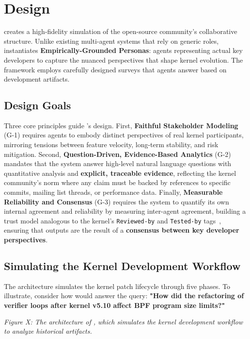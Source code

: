 
\section{Design}
\label{sec:design}

\sys creates a high-fidelity simulation of the open-source community's collaborative structure. Unlike existing multi-agent systems that rely on generic roles, \sys instantiates \textbf{Empirically-Grounded Personas}: agents representing actual key developers to capture the nuanced perspectives that shape kernel evolution. The framework employs carefully designed surveys that agents answer based on development artifacts.

\subsection{Design Goals}

Three core principles guide \sys's design. First, \textbf{Faithful Stakeholder Modeling} (G-1) requires agents to embody distinct perspectives of real kernel participants, mirroring tensions between feature velocity, long-term stability, and risk mitigation. Second, \textbf{Question-Driven, Evidence-Based Analytics} (G-2) mandates that the system answer high-level natural language questions with quantitative analysis and \textbf{explicit, traceable evidence}, reflecting the kernel community's norm where any claim must be backed by references to specific commits, mailing list threads, or performance data. Finally, \textbf{Measurable Reliability and Consensus} (G-3) requires the system to quantify its own internal agreement and reliability by measuring inter-agent agreement, building a trust model analogous to the kernel's \texttt{Reviewed-by} and \texttt{Tested-by} tags~\cite{kerneldocs-submitting}, ensuring that outputs are the result of a \textbf{consensus between key developer perspectives}.


\subsection{Simulating the Kernel Development Workflow}

The \sys architecture simulates the kernel patch lifecycle through five phases. To illustrate, consider how \sys would answer the query: \textbf{"How did the refactoring of verifier loops after kernel v5.10 affect BPF program size limits?"}

\emph{Figure X: The architecture of \sys, which simulates the kernel development workflow to analyze historical artifacts.}

